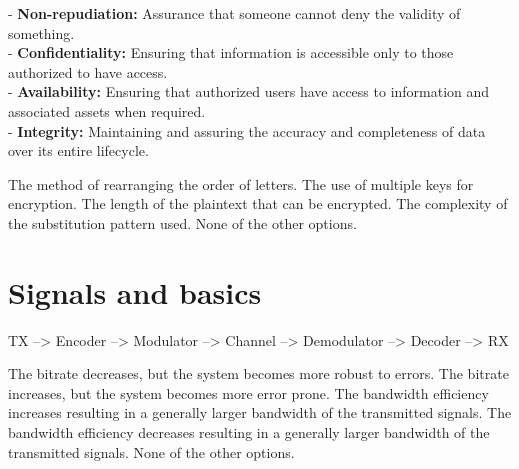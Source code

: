 \begin{questions}
    \begin{solution}
    - \textbf{Non-repudiation:} Assurance that someone cannot deny the validity of something. \\
    - \textbf{Confidentiality:} Ensuring that information is accessible only to those authorized to have access. \\
    - \textbf{Availability:} Ensuring that authorized users have access to information and associated assets when required. \\
    - \textbf{Integrity:} Maintaining and assuring the accuracy and completeness of data over its entire lifecycle. \\
    \end{solution}

    \begin{checkboxes}
        \choice The method of rearranging the order of letters.
        \choice The use of multiple keys for encryption.
        \choice The length of the plaintext that can be encrypted.
        \CorrectChoice The complexity of the substitution pattern used.
        \choice None of the other options.
    \end{checkboxes}

    \section{Signals and basics}





    TX --> Encoder --> Modulator  --> Channel  --> Demodulator  --> Decoder  --> RX

    \begin{checkboxes}
        \choice The bitrate decreases, but the system becomes more robust to errors.
        \CorrectChoice The bitrate increases, but the system becomes more error prone.
        \choice The bandwidth efficiency increases resulting in a generally larger bandwidth of the transmitted signals.
        \choice The bandwidth efficiency decreases resulting in a generally larger bandwidth of the transmitted signals.
        \choice None of the other options.
    \end{checkboxes}



\end{questions}
